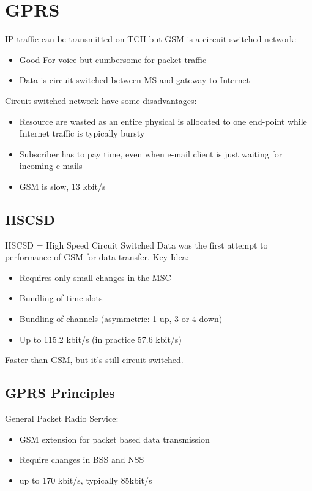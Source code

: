 
\section{GPRS}

IP traffic can be transmitted on TCH but GSM is a circuit-switched network:
\begin{itemize}
	\item Good For voice but cumbersome for packet traffic
	\item Data is circuit-switched between MS and gateway to Internet
\end{itemize}
Circuit-switched network have some disadvantages:
\begin{itemize}
	\item Resource are wasted as an entire physical is allocated to one end-point
	while Internet traffic is typically bursty
	\item Subscriber has to pay time, even when e-mail client is just waiting
	for incoming e-mails
	\item GSM is slow, 13 kbit/s
\end{itemize}
\subsection{HSCSD}
HSCSD = High Speed Circuit Switched Data was the first attempt to performance
of GSM for data transfer. Key Idea:
\begin{itemize}
	\item Requires only small changes in the MSC
	\item Bundling of time slots
	\item Bundling of channels (asymmetric: 1 up, 3 or 4 down)
	\item Up to 115.2 kbit/s (in practice 57.6 kbit/s)
\end{itemize}
Faster than GSM, but it's still circuit-switched.

\subsection{GPRS Principles}
General Packet Radio Service:
\begin{itemize}
	\item GSM extension for packet based data transmission
	\item Require changes in BSS and NSS
	\item up to 170 kbit/s, typically 85kbit/s
\end{itemize}
